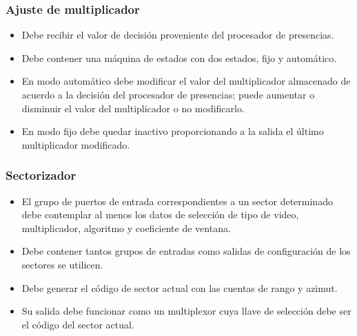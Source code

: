 \subsubsection{Ajuste de multiplicador}
\begin{itemize}
\item Debe recibir el valor de decisión proveniente del procesador de presencias.
\item Debe contener una máquina de estados con dos estados, fijo y automático.
\item En modo automático debe modificar el valor del multiplicador almacenado de acuerdo a la decisión del procesador de presencias; puede aumentar o disminuir el valor del multiplicador o no modificarlo.
\item En modo fijo debe quedar inactivo proporcionando a la salida el último multiplicador modificado.
\end{itemize}

\subsubsection{Sectorizador}
\begin{itemize}
\item El grupo de puertos de entrada correspondientes a un sector determinado debe contemplar al menos los datos de selección de tipo de video, multiplicador, algoritmo y coeficiente de ventana.
\item Debe contener tantos grupos de entradas como salidas de configuración de los sectores se utilicen.
\item Debe generar el código de sector actual con las cuentas de rango y azimut.
\item Su salida debe funcionar como un multiplexor cuya llave de selección debe ser el código del sector actual.
\end{itemize}


